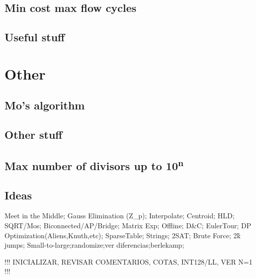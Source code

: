 \begin{multicols}{2}
\subsection{Min cost max flow cycles}

\subsection{Useful stuff}



\section{Other}

\subsection{Mo's algorithm}

\subsection{Other stuff}

\subsection{Max number of divisors up to 10\textsuperscript{n}}

\subsection{Ideas}
Meet in the Middle; Gauss Elimination (Z\_p); Interpolate; Centroid; HLD;
SQRT/Mos; Biconnected/AP/Bridge; Matrix Exp; Offline; D\&C; EulerTour;
DP Optimization(Aliens,Knuth,etc); SparseTable; Strings; 2SAT;
Brute Force; 2\^k jumps;
Small-to-large;randomize;ver diferencias;berlekamp;

!!! INICIALIZAR, REVISAR COMENTARIOS, COTAS, INT128/LL, VER N=1 !!!



\end{multicols}



